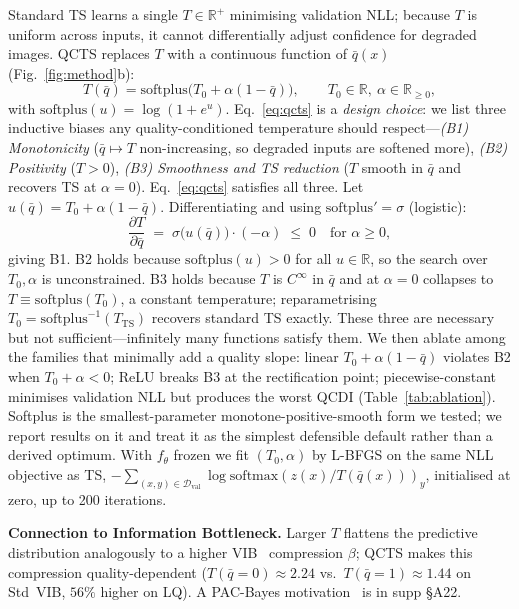 \documentclass{bmvc2k}
\newcommand{\qbar}{\bar{q}}
\newcommand{\R}{\mathbb{R}}
\newcommand{\D}{\mathcal{D}}
\begin{document}
Standard TS learns a single $T\in\R^+$ minimising validation NLL; because $T$ is uniform across inputs, it cannot differentially adjust confidence for degraded images. QCTS replaces $T$ with a continuous function of $\qbar(x)$ (Fig.~\ref{fig:method}b):
\begin{equation}
T(\qbar) = \mathrm{softplus}\big(T_0 + \alpha (1 - \qbar)\big),\qquad T_0\in\R,\ \alpha\in\R_{\ge 0},
\label{eq:qcts}
\end{equation}
with $\mathrm{softplus}(u){=}\log(1{+}e^u)$. Eq.~\ref{eq:qcts} is a \emph{design choice}: we list three inductive biases any quality-conditioned temperature should respect---\emph{(B1) Monotonicity} ($\qbar\mapsto T$ non-increasing, so degraded inputs are softened more), \emph{(B2) Positivity} ($T{>}0$), \emph{(B3) Smoothness and TS reduction} ($T$ smooth in $\qbar$ and recovers TS at $\alpha{=}0$). Eq.~\ref{eq:qcts} satisfies all three. Let $u(\qbar){=}T_0{+}\alpha(1{-}\qbar)$. Differentiating and using $\mathrm{softplus}'{=}\sigma$ (logistic):
\begin{equation}
\frac{\partial T}{\partial \qbar} \;=\; \sigma\!\big(u(\qbar)\big)\cdot(-\alpha) \;\le\; 0\quad\text{for } \alpha{\ge}0,
\label{eq:b1}
\end{equation}
giving B1. B2 holds because $\mathrm{softplus}(u){>}0$ for all $u\in\R$, so the search over $T_0,\alpha$ is unconstrained. B3 holds because $T$ is $C^\infty$ in $\qbar$ and at $\alpha{=}0$ collapses to $T{\equiv}\mathrm{softplus}(T_0)$, a constant temperature; reparametrising $T_0{=}\mathrm{softplus}^{-1}(T_\mathrm{TS})$ recovers standard TS exactly. These three are necessary but not sufficient---infinitely many functions satisfy them. We then ablate among the families that minimally add a quality slope: linear $T_0{+}\alpha(1{-}\qbar)$ violates B2 when $T_0{+}\alpha{<}0$; ReLU breaks B3 at the rectification point; piecewise-constant minimises validation NLL but produces the worst QCDI (Table~\ref{tab:ablation}). Softplus is the smallest-parameter monotone-positive-smooth form we tested; we report results on it and treat it as the simplest defensible default rather than a derived optimum. With $f_\theta$ frozen we fit $(T_0,\alpha)$ by L-BFGS on the same NLL objective as TS, $-\sum_{(x,y)\in\D_\text{val}}\log\mathrm{softmax}(z(x)/T(\qbar(x)))_y$, initialised at zero, up to 200 iterations.

\textbf{Connection to Information Bottleneck.}
Larger $T$ flattens the predictive distribution analogously to a higher VIB~\cite{alemi2017vib} compression $\beta$; QCTS makes this compression quality-dependent ($T(\qbar{=}0){\approx}2.24$ vs.\ $T(\qbar{=}1){\approx}1.44$ on Std~VIB, $56\%$ higher on LQ). A PAC-Bayes motivation~\cite{mcallester1999pac} is in supp \S A22.
\end{document}
